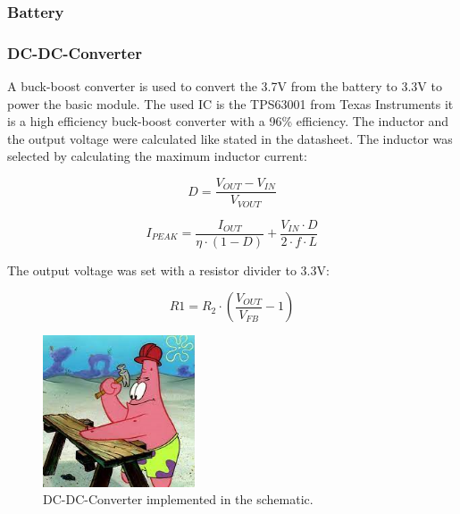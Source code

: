     \subsubsection{Battery}

    \subsubsection{DC-DC-Converter}

        A buck-boost converter is used to convert the 3.7V from the battery to 3.3V to power the
        basic module. The used IC is the TPS63001 from Texas Instruments it is a high efficiency
        buck-boost converter with a 96\% efficiency. The inductor and the output voltage were
        calculated like stated in the datasheet\cite{}. The inductor was selected by calculating
        the maximum inductor current:

        \begin{equation}
            D = \frac{V_{OUT} - V_{IN} }{V_{VOUT}}
        \end{equation}

        \begin{equation}
            I_{PEAK} = \frac{I_{OUT}}{\eta \cdot (1 - D)} + \frac{V_{IN} \cdot D}{2 \cdot f \cdot L} 
        \end{equation}

        The output voltage was set with a resistor divider to 3.3V:

        \begin{equation}
            R1 = R_2 \cdot (\frac{V_{OUT}}{V_{FB}} - 1)
        \end{equation}

        \begin{figure}[H]
            \centering
            \includegraphics[width=0.4\textwidth]{assets/HW/TBD2.png}
            \caption{DC-DC-Converter implemented in the schematic.}
        \end{figure}

